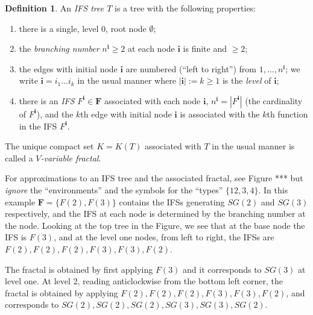 \documentclass[a4paper]{amsart}
\theoremstyle{plain}
\theoremstyle{definition}
\newtheorem{definition}[theorem]{Definition}%
\theoremstyle{remark}
\begin{document}
\begin{definition}  An \emph{IFS tree $ T $} is  a    tree with the following properties: 
\begin{enumerate}
\item there is a single, level 0, root node $ \emptyset $;
\item the \emph{branching number} $ n^{\boldsymbol{i}} \geq 2 $   at   each node $ \boldsymbol{i}  $ is finite and $ \geq 2 $;
\item the  edges with  initial node $ \boldsymbol{i} $ are numbered (``left to right'') from $ 1,\dots, n^{\boldsymbol{i}} $;      we   write $ \boldsymbol{i} = i_1\dots i_{k }$ in the usual manner where $| \boldsymbol{i} | := k \geq 1$ is the \emph{level} of $ \boldsymbol{i}$;
\item there is an \emph{IFS} $ F^{ \boldsymbol{i} } \in \boldsymbol{F} $ associated with each node $ \boldsymbol{i} $,  $ n^ {\boldsymbol{i}} = |  F^{ \boldsymbol{i} } |  $ (the cardinality of $  F^{ \boldsymbol{i} }$), and the $k $th edge with initial node $ \boldsymbol{i} $ is associated with the $ k  $th function in the IFS $ F^{ \boldsymbol{i}}$.
\end{enumerate} 
The   unique compact set $ K = K(T)$ associated with $ T $ in the usual manner is called a \emph{$ V $-variable fractal}.
\end{definition} 

\medskip For   approximations to an IFS tree and the associated  fractal, see  Figure *** but  \emph{ignore} the ``environments'' and the symbols for the ``types'' $ \{12,3,4\}$.  In this example $ \boldsymbol{F} = \{F(2), F(3)\} $  contains the IFSs generating $ SG(2) $ and $ SG(3) $ respectively, and the IFS at each node is  determined by the branching number at the node.
Looking at the top tree in the Figure, we see that at the base node the IFS is $ F(3) $, and at the level one nodes, from left to right, the IFSs are $F(2), F(2), F(2), F(3), F(3), F(2) $.

The fractal is obtained by first applying $ F(3) $ and it corresponds to $ SG(3) $ at   level one.  At   level 2, reading anticlockwise from the bottom left corner, the fractal is obtained by applying $  F(2), F(2), F(2), F(3), F(3), F(2) $, and corresponds to $SG(2), SG(2), SG(2), SG(3), SG(3), SG(2) $.
\end{document}
